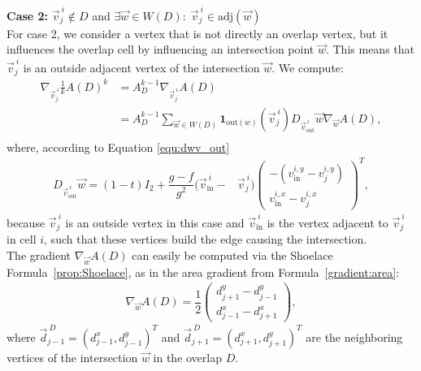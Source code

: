 \begin{proposition}
	\textbf{Case 2:} $\vec{v}_j^{\: i} \notin D$ and $\exists \vec{w} \in W(D): \; \vec{v}_j^{\: i} \in \text{adj}(\vec{w})$\\
	For case 2, we consider a vertex that is not directly an overlap vertex, but it influences the overlap cell by influencing an intersection point $\vec{w}$. 
	This means that $\vec{v}_j^{\: i}$ is an outside adjacent vertex of the intersection $\vec{w}$. 
	We compute:
	\begin{align*}
		\nabla_{\vec{v}_j^{\: i}} \frac{1}{k} A(D)^k 
		&= A_{D}^{k-1} \nabla_{\vec{v}_j^{\: i}} A(D) \\
		&= A_{D}^{k-1} \sum\limits_{\vec{w} \in W(D)} \mathbf{1}_{\text{out}(w)}(\vec{v}_{j}^{\: i}) D_{\vec{v}_{\text{out}}^{\: i}} \vec{w}\nabla_{\vec{w}}A(D), \\
	\end{align*}
	where, according to Equation \ref{equ:dwv_out}
	\begin{align*}
		D_{\vec{v}_{\text{out}}^{\: i}} \vec{w} = (1-t)I_2 + \dfrac{g - f}{g^2}(\vec{v}_{\text{in}}^{\: i} - &\vec{v}_j^{\: i}) \begin{pmatrix}
			-(v_{\text{in}}^{i, y} - v_{j}^{i, y}) \\[0.5em]
			 v_{\text{in}}^{i, x} - v_{j}^{i, x}
		\end{pmatrix}^T,
	\end{align*}
	because $\vec{v}_j^{\: i}$ is an outside vertex in this case and $\vec{v}_{\text{in}}^{\: i}$ is the vertex adjacent to $\vec{v}_j^{\: i}$ in cell $i$, such that these vertices build the edge causing the intersection. \\
	The gradient $\nabla_{\vec{w}}A(D)$ can easily be computed via the Shoelace Formula~\ref{prop:Shoelace}, as in the area gradient from Formula~\ref{gradient:area}:
	\begin{align*}
		\nabla_{\vec{w}}A(D) = \dfrac{1}{2} \begin{pmatrix} d_{j+1}^{y} - d_{j-1}^{y} \\[0.5em]  d_{j-1}^{x} - d_{j+1}^{x} \end{pmatrix},
	\end{align*}
	where $\vec{d}_{j-1}^{\: D} = (d_{j-1}^{x}, d_{j-1}^{y})^T$ and $\vec{d}_{j+1}^{\: D} = (d_{j+1}^{x}, d_{j+1}^{y})^T$ are the neighboring vertices of the intersection $\vec{w}$ in the overlap $D$.\\


\end{proposition}

